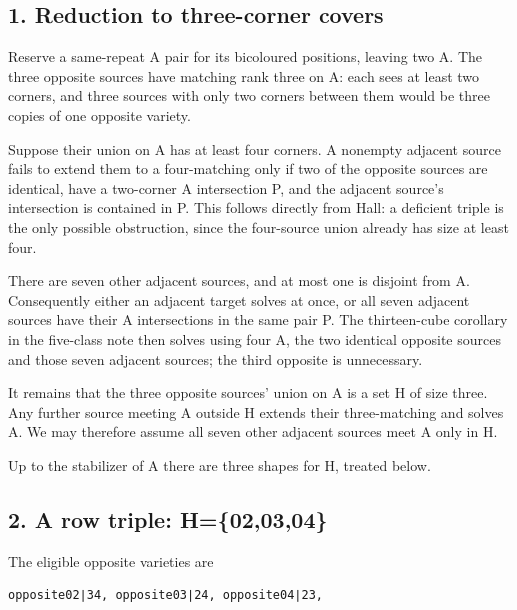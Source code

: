 \documentclass[
  10pt,
]{article}
\begin{document}
\hypertarget{reduction-to-three-corner-covers}{%
\subsection*{1. Reduction to three-corner
covers}\label{reduction-to-three-corner-covers}}

Reserve a same-repeat A pair for its bicoloured positions, leaving two
A. The three opposite sources have matching rank three on A: each sees
at least two corners, and three sources with only two corners between
them would be three copies of one opposite variety.

Suppose their union on A has at least four corners. A nonempty adjacent
source fails to extend them to a four-matching only if two of the
opposite sources are identical, have a two-corner A intersection P, and
the adjacent source's intersection is contained in P. This follows
directly from Hall: a deficient triple is the only possible obstruction,
since the four-source union already has size at least four.

There are seven other adjacent sources, and at most one is disjoint from
A. Consequently either an adjacent target solves at once, or all seven
adjacent sources have their A intersections in the same pair P. The
thirteen-cube corollary in the five-class note then solves using four A,
the two identical opposite sources and those seven adjacent sources; the
third opposite is unnecessary.

It remains that the three opposite sources' union on A is a set H of
size three. Any further source meeting A outside H extends their
three-matching and solves A. We may therefore assume all seven other
adjacent sources meet A only in H.

Up to the stabilizer of A there are three shapes for H, treated below.

\hypertarget{a-row-triple-h020304}{%
\subsection*{2. A row triple:
H=\{02,03,04\}}\label{a-row-triple-h020304}}

The eligible opposite varieties are

\begin{verbatim}
opposite02∣34, opposite03∣24, opposite04∣23,
\end{verbatim}
\end{document}
